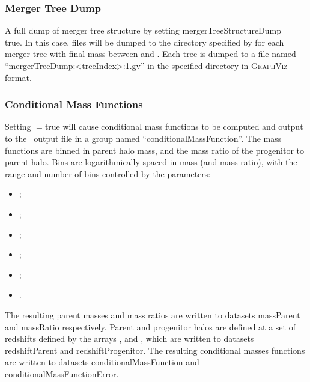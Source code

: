 \subsubsection{Merger Tree Dump}

A full dump of merger tree structure by setting {\normalfont \ttfamily mergerTreeStructureDump}$=${\normalfont \ttfamily true}. In this case, files will be dumped to the directory specified by {\normalfont \ttfamily [mergerTreeStructureDumpDirectory]} for each merger tree with final mass between {\normalfont \ttfamily [mergerTreeStructureDumpMassMinimum]} and {\normalfont \ttfamily [mergerTreeStructureDumpMassMaximum]}. Each tree is dumped to a file named ``{\normalfont \ttfamily mergerTreeDump:\textless treeIndex\textgreater:1.gv}'' in the specified directory in {\normalfont \scshape GraphViz} format.

\subsubsection{Conditional Mass Functions}

Setting {\normalfont \ttfamily [mergerTreeComputeConditionalMassFunction]}$=${\normalfont \ttfamily true} will cause conditional mass functions to be computed and output to the \glc\ output file in a group named ``{\normalfont \ttfamily conditionalMassFunction}''. The mass functions are binned in parent halo mass, and the mass ratio of the progenitor to parent halo. Bins are logarithmically spaced in mass (and mass ratio), with the range and number of bins controlled by the parameters:
\begin{itemize}
\item {\normalfont \ttfamily [mergerTreeComputeConditionalMassFunctionParentMassCount]};
\item {\normalfont \ttfamily [mergerTreeComputeConditionalMassFunctionParentMassMinimum]};
\item {\normalfont \ttfamily [mergerTreeComputeConditionalMassFunctionParentMassMaximum]};
\item {\normalfont \ttfamily [mergerTreeComputeConditionalMassFunctionMassRatioCount]};
\item {\normalfont \ttfamily [mergerTreeComputeConditionalMassFunctionMassRatioMinimum]};
\item {\normalfont \ttfamily [mergerTreeComputeConditionalMassFunctionMassRatioMaximum]}.
\end{itemize}
The resulting parent masses and mass ratios are written to datasets {\normalfont \ttfamily massParent} and {\normalfont \ttfamily massRatio} respectively. Parent and progenitor halos are defined at a set of redshifts defined by the arrays {\normalfont \ttfamily [mergerTreeComputeConditionalMassFunctionParentRedshifts]}, and {\normalfont \ttfamily [mergerTreeComputeConditionalMassFunctionProgenitorRedshifts]}, which are written to datasets {\normalfont \ttfamily redshiftParent} and {\normalfont \ttfamily redshiftProgenitor}. The resulting conditional masses functions are written to datasets {\normalfont \ttfamily conditionalMassFunction} and {\normalfont \ttfamily conditionalMassFunctionError}.

